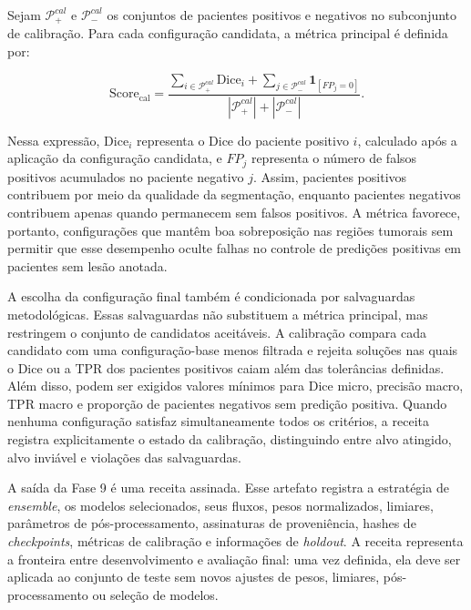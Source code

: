 Sejam $\mathcal{P}_+^{cal}$ e $\mathcal{P}_-^{cal}$ os conjuntos de pacientes
positivos e negativos no subconjunto de calibração. Para cada configuração
candidata, a métrica principal é definida por:

\begin{equation}
    \mathrm{Score}_{\mathrm{cal}} =
    \frac{
    \sum_{i\in\mathcal{P}_+^{cal}}\mathrm{Dice}_i
    +
    \sum_{j\in\mathcal{P}_-^{cal}}\mathbf{1}_{[FP_j=0]}
    }{
    |\mathcal{P}_+^{cal}| + |\mathcal{P}_-^{cal}|
    }.
    \label{eq:balanced_calibration_score}
\end{equation}

Nessa expressão, $\mathrm{Dice}_i$ representa o Dice do paciente positivo $i$,
calculado após a aplicação da configuração candidata, e $FP_j$ representa o
número de falsos positivos acumulados no paciente negativo $j$. Assim, pacientes
positivos contribuem por meio da qualidade da segmentação, enquanto pacientes
negativos contribuem apenas quando permanecem sem falsos positivos. A métrica
favorece, portanto, configurações que mantêm boa sobreposição nas regiões
tumorais sem permitir que esse desempenho oculte falhas no controle de
predições positivas em pacientes sem lesão anotada.

A escolha da configuração final também é condicionada por salvaguardas
metodológicas. Essas salvaguardas não substituem a métrica principal, mas
restringem o conjunto de candidatos aceitáveis. A calibração compara cada
candidato com uma configuração-base menos filtrada e rejeita soluções nas quais o
Dice ou a TPR dos pacientes positivos caiam além das tolerâncias definidas. Além
disso, podem ser exigidos valores mínimos para Dice micro, precisão macro, TPR
macro e proporção de pacientes negativos sem predição positiva. Quando nenhuma
configuração satisfaz simultaneamente todos os critérios, a receita registra
explicitamente o estado da calibração, distinguindo entre alvo atingido, alvo
inviável e violações das salvaguardas.

A saída da Fase 9 é uma receita  assinada. Esse artefato registra a estratégia
de \textit{ensemble}, os modelos selecionados, seus fluxos, pesos normalizados,
limiares, parâmetros de pós-processamento, assinaturas de proveniência, hashes de
\textit{checkpoints}, métricas de calibração e informações de \textit{holdout}.
A receita representa a fronteira entre desenvolvimento e avaliação final: uma vez
definida, ela deve ser aplicada ao conjunto de teste sem novos ajustes de pesos,
limiares, pós-processamento ou seleção de modelos.

